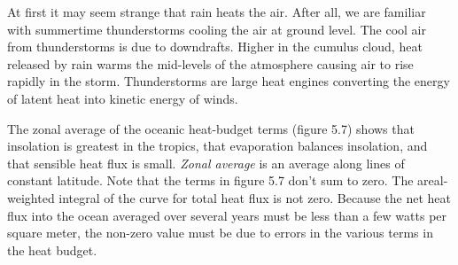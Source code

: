 At first it may seem strange that rain heats the air. After all, we
are familiar with summertime thunderstorms cooling the air at ground
level. The cool air from thunderstorms is due to downdrafts. Higher in
the cumulus cloud, heat released by rain warms the mid-levels of the
atmosphere causing air to rise rapidly in the storm. Thunderstorms are
large heat engines converting the energy of latent heat into kinetic
energy of winds.

The zonal average of the oceanic heat-budget terms (figure 5.7) shows
that insolation is greatest in the
tropics, that evaporation balances
insolation, and that
sensible heat flux is small.
\textit{Zonal average} is an
average along lines of constant latitude. Note that the terms in
figure 5.7 don't sum to zero. The areal-weighted integral of the curve
for total heat flux is not
zero. Because the net heat flux into
the ocean averaged over several years must be less than a few watts
per square meter, the non-zero value must be due to errors in the
various terms in the heat budget.

